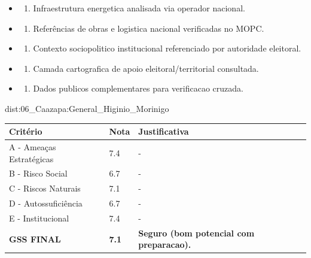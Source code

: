 {\begin{itemize}
\item
  \begin{enumerate}
  \def\labelenumi{\arabic{enumi})}
  \setcounter{enumi}{7}
  \tightlist
  \item
    Infraestrutura energetica analisada via operador nacional.
  \end{enumerate}
\item
  \begin{enumerate}
  \def\labelenumi{\arabic{enumi})}
  \setcounter{enumi}{8}
  \tightlist
  \item
    Referências de obras e logistica nacional verificadas no MOPC.
  \end{enumerate}
\item
  \begin{enumerate}
  \def\labelenumi{\arabic{enumi})}
  \setcounter{enumi}{9}
  \tightlist
  \item
    Contexto sociopolitico institucional referenciado por autoridade
    eleitoral.
  \end{enumerate}
\item
  \begin{enumerate}
  \def\labelenumi{\arabic{enumi})}
  \setcounter{enumi}{10}
  \tightlist
  \item
    Camada cartografica de apoio eleitoral/\allowbreak territorial consultada.
  \end{enumerate}
\item
  \begin{enumerate}
  \def\labelenumi{\arabic{enumi})}
  \setcounter{enumi}{11}
  \tightlist
  \item
    Dados publicos complementares para verificacao cruzada.
  \end{enumerate}
\end{itemize}}{dist:06_Caazapa:General_Higinio_Morinigo}
\begin{table}[ht!]
\small \begin{tabular}{p{3.0cm}p{0.8cm}p{6.0cm}} \toprule
\textbf{Critério} & \textbf{Nota} & \textbf{Justificativa} \\ \midrule
A - Ameaças Estratégicas & 7.4 & - \\
B - Risco Social & 6.7 & - \\
C - Riscos Naturais & 7.1 & - \\
D - Autossuficiência & 6.7 & - \\
E - Institucional & 7.4 & - \\
\midrule \textbf{GSS FINAL} & \textbf{7.1} & \textbf{Seguro (bom potencial com preparacao).} \\ \bottomrule \end{tabular}
\end{table}
